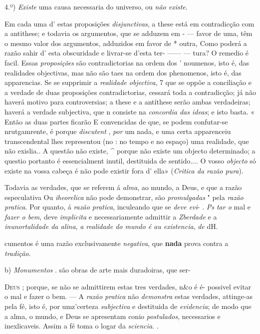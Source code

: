 4.º) \emph{Existe} uma causa necessaria do universo, ou \emph{não existe}.

Em cada uma d' estas proposições \emph{disjunctivas}, a these está em contradicção com a antithese; e todavia os argumentos, que se adduzem em - \textbar{} --- favor de uma, têm o mesmo valor dos argumentos, adduzidos em favor de \textbar{} * outra, Como poderá a razão sahir d' esta obscuridade e livrar-se d'esta ter- ------ --- tura? O remedio é facil. Essas \emph{proposições} são contradictorias na ordem dos ' noumenos, isto é, das realidades objectivas, mas não são taes na ordem dos phenomenos, isto é, das apparencias. Se se supprimir a \emph{realidade objectiva}, 7 que se oppõe a conciliação e a verdade de duas proposições contradictorias, cessará toda a contradicção; já não haverá motivo para controversias; a these e a antíthese serão ambas verdadeiras; haverá a verdade subjectiva, que n consiste na \emph{concordia das ideas}; e isto basta. « Então as duas partes ficarão E convencidas de que, se podem confutar-se nrutgamrente, é porque \emph{discutent} , \emph{por} um nada, e uma certa apparenceiu transcendental lhes representou (no : no tempo e no espaço) uma realidade, que não exislia.. A questão não existe, \textasciicircum{} porque não existe um objecto determinado; a questio portanto é essencialment inutil, destituida de sentido.... O vosso \emph{objecto} só existe na vossa cabeça é não pode existir fora d' ella» (\emph{Critica da razão pura}).

Todavia as verdades, que se referem á \emph{alma}, ao mundo, a Deus, e que a razão especulativa Ou \emph{iheorelica} não pode demonstrar, são \emph{promulgadas} " pela \emph{razão pratica}. Por quanto, á \emph{razão pratica}, inculeando que se \emph{deve evi}- . \emph{Ps tar o} mal e \emph{fazer o bem}, deve \emph{implicita} e necessariamente admittir a \emph{Zberdade} e a \emph{inunortalidade da alina}, \emph{a realidade do mundo é au existencia}, \emph{de} dH.

cumentos é uma razão exclusivamente \emph{negativa}, que \textbf{nada} prova contra a \emph{tradição}.

b) \emph{Monumentos} . são obras de arte mais duradoiras, que ser-

\textsc{Deus} ; porque, se não se admittirem estas tres verdades, n\&o é é- possivel evitar o mal e fazer o bem. --- A \emph{razão pratica} não \emph{demonstra} estas verdades, attinge-as pela fé, isto é, por umz'certeza \emph{subjectiva} e destituida de \emph{evidencia}; de modo que a alma, o mundo, e Deus se apresentam conio \emph{postulados}, necessarios e inexlicaveis. Assim a fé toma o logar da \emph{sciencia}. .

